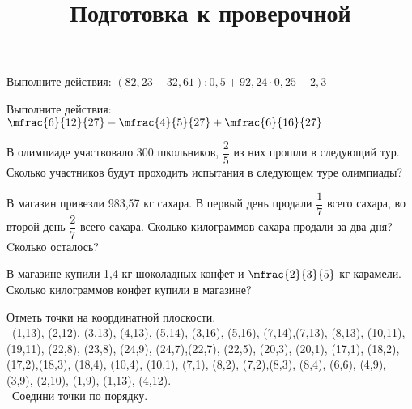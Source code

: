 \begin{class}[number=7]
	\title{Подготовка к проверочной}
	\begin{listofex}
		\item Выполните действия: \( (82,23-32,61):0,5+92,24\cdot0,25-2,3 \)
		\item Выполните действия: \( \mfrac{6}{12}{27}-\mfrac{4}{5}{27}+\mfrac{6}{16}{27} \)
		\item В олимпиаде участвовало 300 школьников, \( \dfrac{2}{5} \)  из них прошли в следующий тур. Сколько участников будут проходить испытания в следующем туре олимпиады?
		\item В магазин привезли 983,57 кг сахара. В первый день продали \( \dfrac{1}{7} \) всего сахара, во второй день  \( \dfrac{2}{7} \) всего сахара. Сколько килограммов сахара продали за два дня? Cколько осталось?
		\item В магазине купили  1,4 кг шоколадных конфет и \( \mfrac{2}{3}{5}\) кг карамели. Сколько килограммов конфет купили в магазине?
		\item Отметь точки на координатной плоскости. \\\
		(1,13), (2,12), (3,13), (4,13), (5,14), (3,16), (5,16), (7,14),(7,13), (8,13), (10,11), (19,11), (22,8), (23,8), (24,9), (24,7),(22,7), (22,5), (20,3), (20,1), (17,1), (18,2), (17,2),(18,3), (18,4), (10,4), (10,1), (7,1), (8,2), (7,2),(8,3), (8,4), (6,6), (4,9), (3,9), (2,10), (1,9), (1,13), (4,12).\\\
		Соедини точки по порядку.
	\end{listofex}
\end{class}

